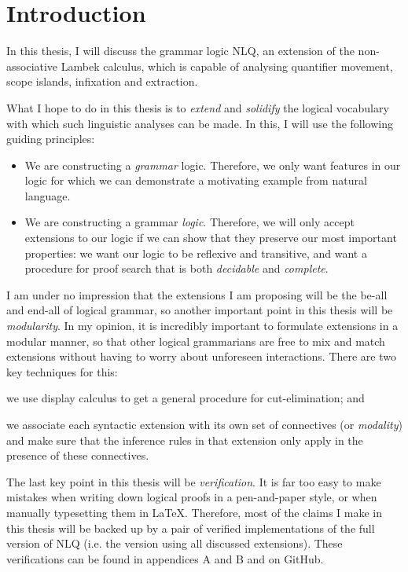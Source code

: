 \section{Introduction}
\label{sec:introduction}

In this thesis, I will discuss the grammar logic NLQ, an extension of
the non-associative Lambek calculus, which is capable of analysing
quantifier movement, scope islands, infixation and extraction.

What I hope to do in this thesis is to \emph{extend} and
\emph{solidify} the logical vocabulary with which such linguistic
analyses can be made. In this, I will use the following guiding
principles:
\begin{itemize}
\item We are constructing a \emph{grammar} logic. Therefore, we only
  want features in our logic for which we can demonstrate a motivating
  example from natural language.
\item We are constructing a grammar \emph{logic}. Therefore, we will
  only accept extensions to our logic if we can show that they
  preserve our most important properties: we want our logic to be
  reflexive and transitive, and want a procedure for proof
  search that is both \emph{decidable} and \emph{complete}.
\end{itemize}
I am under no impression that the extensions I am proposing will be
the be-all and end-all of logical grammar, so another important point
in this thesis will be \emph{modularity}.
In my opinion, it is incredibly important to formulate extensions in a
modular manner, so that other logical grammarians are free to mix and
match extensions without having to worry about unforeseen
interactions. There are two key techniques for this:
\begin{enumerate*}[label=(\arabic*)]
\item
  we use display calculus to get a general procedure for
  cut-elimination; and
\item
  we associate each syntactic extension with its own set of
  connectives (or \emph{modality}) and make sure that the inference
  rules in that extension only apply in the presence of these
  connectives.
\end{enumerate*}

The last key point in this thesis will be \emph{verification}. It is
far too easy to make mistakes when writing down logical proofs in a
pen-and-paper style, or when manually typesetting them in
\LaTeX. Therefore, most of the claims I make in this thesis will be
backed up by a pair of verified implementations of the full version
of NLQ (i.e. the version using all discussed extensions).
These verifications can be found in appendices A and B and on GitHub.

